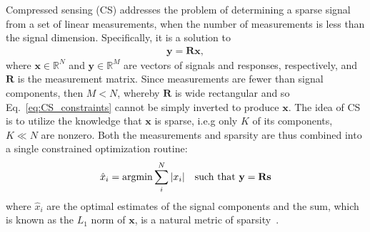 \documentclass[9pt,twoside,lineno]{pnas-new}
\begin{document}
Compressed sensing (CS) addresses the problem of determining a sparse signal from a set of linear measurements, when the number of measurements is less than the signal dimension. Specifically, it is a solution to 
\begin{align}
\mathbf y = \mathbf R\mathbf x,
\label{eq:CS_constraints}
\end{align} where $\mathbf x \in \mathbb{R}^N$ and $\mathbf y\in \mathbb{R}^M$ are vectors of signals and responses, respectively, and $\mathbf R$ is the measurement matrix. Since measurements are fewer than signal components, then $M < N$, whereby $\mathbf R$ is wide rectangular and so Eq.~\ref{eq:CS_constraints} cannot be simply inverted to produce $\mathbf x$. The idea of CS is to utilize the knowledge that $\mathbf x$ is sparse, i.e.g only $K$ of its components, $K \ll N$ are nonzero. Both the measurements and sparsity are thus combined into a single constrained optimization routine:
\begin{align}
\hat x_i = \textup{argmin} \sum_i^N |x_i| \quad \textup{such that } \mathbf y = \mathbf R\mathbf s
\label{eq:CS}
\end{align}
where $\hat x_i$ are the optimal estimates of the signal components and the sum, which is known as the $L_1$ norm of $\mathbf x$, is a natural metric of sparsity~\cite{CS_donoho}. 
\end{document}
